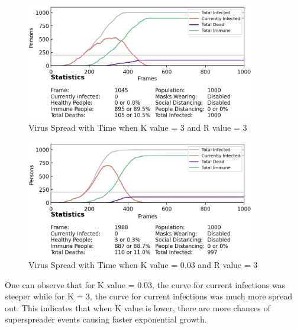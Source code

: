 \documentclass[11pt]{article}
\begin{document}
\begin{figure}[H]
    \centering
    \includegraphics[width=10cm]{figures/k_value_comparison_3.png}
    \caption{Virus Spread with Time when K value = 3 and R value = 3}
    \label{k_value_3}
\end{figure}

\begin{figure}[H]
    \centering
    \includegraphics[width=10cm]{figures/k_value_comparison_0.03.png}
    \caption{Virus Spread with Time when K value = 0.03 and R value = 3}
    \label{k_value_0.03}
\end{figure}

One can observe that for K value = 0.03, the curve for current infections was steeper while for K = 3, the curve for current infections was much more spread out. This indicates that when K value is lower, there are more chances of superspreader events causing faster exponential growth.
\end{document}
